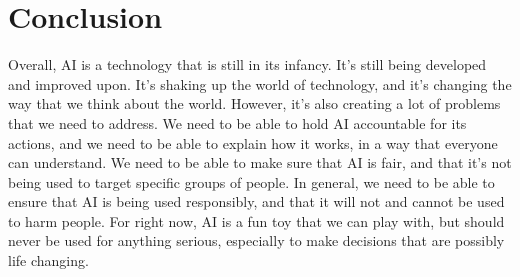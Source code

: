 \documentclass[12pt]{article}
\begin{document}
    \section{Conclusion}
    Overall, AI is a technology that is still in its infancy. It's still being developed and
    improved upon. It's shaking up the world of technology, and it's changing the way that we think
    about the world. However, it's also creating a lot of problems that we need to address. We need
    to be able to hold AI accountable for its actions, and we need to be able to explain how it works,
    in a way that everyone can understand. We need to be able to make sure that AI is fair, and that
    it's not being used to target specific groups of people. In general, we need to be able to ensure
    that AI is being used responsibly, and that it will not and cannot be used to harm people. For
    right now, AI is a fun toy that we can play with, but should never be used for anything serious,
    especially to make decisions that are possibly life changing.

    \clearpage
    
    \printbibliography{}
\end{document}
